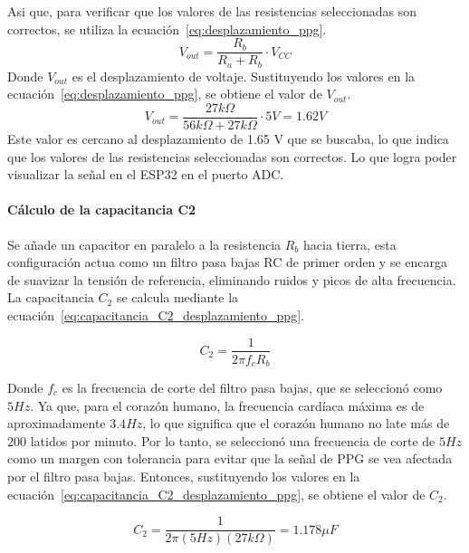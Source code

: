         Asi que, para verificar que los valores de las resistencias seleccionadas son correctos, se utiliza la ecuación~\ref{eq:desplazamiento_ppg}.
        \begin{equation}
            \label{eq:desplazamiento_ppg}
            V_{out} = \frac{R_b}{R_a + R_b} \cdot V_{CC}
        \end{equation}
        Donde $V_{out}$ es el desplazamiento de voltaje. Sustituyendo los valores en la ecuación~\ref{eq:desplazamiento_ppg}, se obtiene el valor de $V_{out}$.
        \begin{equation}
            V_{out} = \frac{27k\Omega}{56k\Omega + 27k\Omega} \cdot 5V = 1.62 V
        \end{equation}
        Este valor es cercano al desplazamiento de 1.65 V que se buscaba, lo que indica que los valores de las resistencias seleccionadas son correctos. Lo que logra poder visualizar la señal en el ESP32 en el puerto ADC.

        \paragraph{Cálculo de la capacitancia C2}
        Se añade un capacitor en paralelo a la resistencia $R_b$ hacia tierra, esta configuración actua como un filtro pasa bajas RC de primer orden y se encarga de suavizar la tensión de referencia, eliminando ruidos y picos de alta frecuencia. La capacitancia $C_2$ se calcula mediante la ecuación~\ref{eq:capacitancia_C2_desplazamiento_ppg}.

        \begin{equation}
            \label{eq:capacitancia_C2_desplazamiento_ppg}
            C_2 = \frac{1}{2\pi f_c R_b}
        \end{equation}

        Donde $f_c$ es la frecuencia de corte del filtro pasa bajas, que se seleccionó como $5 Hz$. Ya que, para el corazón humano, la frecuencia cardíaca máxima es de aproximadamente $3.4 Hz$, lo que significa que el corazón humano no late más de 200 latidos por minuto. Por lo tanto, se seleccionó una frecuencia de corte de $5 Hz$ como un margen con tolerancia para evitar que la señal de PPG se vea afectada por el filtro pasa bajas.  
        Entonces, sustituyendo los valores en la ecuación~\ref{eq:capacitancia_C2_desplazamiento_ppg}, se obtiene el valor de $C_2$.
        
        \begin{equation}
            C_2 = \frac{1}{2\pi (5 Hz) (27k\Omega)} = 1.178 \mu F
        \end{equation}

